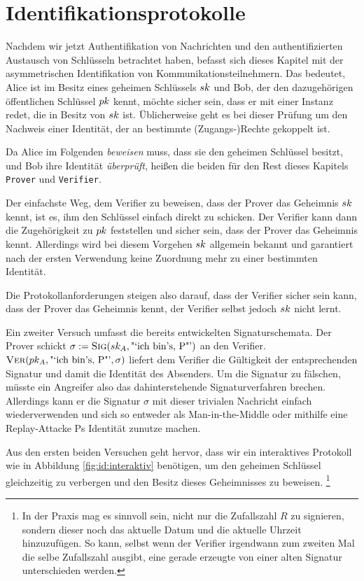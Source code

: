 \chapter{Identifikationsprotokolle}
Nachdem wir jetzt Authentifikation von Nachrichten und den authentifizierten Austausch von Schlüsseln betrachtet haben, befasst sich dieses Kapitel mit der
asymmetrischen Identifikation von Kommunikationsteilnehmern. Das bedeutet, Alice ist im Besitz eines geheimen Schlüssels $sk$ und Bob, der den dazugehörigen
öffentlichen Schlüssel $pk$ kennt, möchte sicher sein, dass er mit einer Instanz redet, die in Besitz von $sk$ ist. Üblicherweise geht es bei dieser
Prüfung um den Nachweis einer Identität, der an bestimmte (Zugangs-)Rechte gekoppelt ist.

Da Alice im Folgenden \emph{beweisen} muss, dass sie den geheimen Schlüssel besitzt, und Bob ihre Identität \emph{überprüft}, heißen die beiden für den Rest
dieses Kapitels \texttt{Prover} \indexProver und \texttt{Verifier}\indexVerifier.

Der einfachste Weg, dem Verifier zu beweisen, dass der Prover das Geheimnis $sk$ kennt, ist es, ihm den Schlüssel einfach direkt zu schicken. Der Verifier
kann dann die Zugehörigkeit zu $pk$ feststellen und sicher sein, dass der Prover das Geheimnis kennt. Allerdings wird bei diesem Vorgehen $sk$ allgemein
bekannt und garantiert nach der ersten Verwendung keine Zuordnung mehr zu einer bestimmten Identität.

Die Protokollanforderungen steigen also darauf, dass der Verifier sicher sein kann, dass der Prover das Geheimnis kennt, der Verifier selbst jedoch $sk$
nicht lernt.

Ein zweiter Versuch umfasst die bereits entwickelten Signaturschemata. Der Prover schickt $\sigma := \textsc{Sig}(sk_A, \text{"`ich bin's, P"'})$ an den Verifier.
$\textsc{Ver}(pk_A,\text{"`ich bin's, P"'}, \sigma)$ liefert dem Verifier die Gültigkeit der entsprechenden Signatur und damit die Identität des Absenders. Um die
Signatur zu fälschen, müsste ein Angreifer also das dahinterstehende Signaturverfahren brechen. Allerdings kann er die Signatur $\sigma$ mit dieser trivialen
Nachricht einfach wiederverwenden und sich so entweder als Man-in-the-Middle oder mithilfe eine Replay-Attacke Ps Identität zunutze machen.

Aus den ersten beiden Versuchen geht hervor, dass wir ein interaktives Protokoll wie in Abbildung \ref{fig:id:interaktiv} benötigen, um den geheimen Schlüssel
gleichzeitig zu verbergen und den Besitz dieses Geheimnisses zu beweisen.%
\footnote{In der Praxis mag es sinnvoll sein, nicht nur die Zufallszahl $R$ zu signieren, sondern dieser noch das aktuelle Datum und die aktuelle Uhrzeit hinzuzufügen. So kann, selbst wenn der Verifier irgendwann zum zweiten Mal die selbe Zufallszahl ausgibt, eine gerade erzeugte von einer alten Signatur unterschieden werden.}

